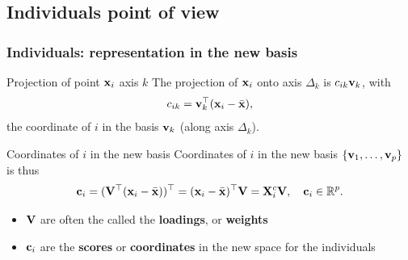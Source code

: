 \documentclass{beamer}\usepackage[]{graphicx}\usepackage[]{color}
\begin{document}
\subsection{Individuals point of view}

\begin{frame}
  \frametitle{Individuals: representation in the new basis}

  \begin{block}{Projection of point $\mathbf{x}_i$ axis $k$}
    The projection of $\mathbf{x}_i$ onto axis $\Delta_k$ is $c_{ik} \mathbf{v}_k$, with 
    \begin{equation*}
      c_{ik} = \mathbf{v}_k^\top (\mathbf{x}_i - \bar{\mathbf{x}}),
    \end{equation*}
     the coordinate of $i$ in the basis $\mathbf{v}_k$ (along axis $\Delta_k$).
  \end{block}

  \begin{block}{Coordinates of $i$ in the new basis}
    Coordinates of $i$ in the new basis $\{\mathbf{v}_1, \dots, \mathbf{v}_p\}$ is thus 
    \begin{equation*}
      \mathbf{c}_i  = (\mathbf{V}^\top (\mathbf{x}_i - \bar{\mathbf{x}}))^\top = (\mathbf{x}_i - \bar{\mathbf{x}})^\top \mathbf{V} = \mathbf{X}^c_i \mathbf{V}, \quad \mathbf{c}_i \in \mathbb{R}^p.
    \end{equation*}

    \begin{itemize}
      \item \alert{$\mathbf{V}$ are often the called the \textbf{loadings}, or \textbf{weights}}
      \item \alert{$ \mathbf{c}_i$ are the \textbf{scores} or \textbf{coordinates} in the new space for the individuals}
    \end{itemize}
  \end{block}
\end{frame}
\end{document}
